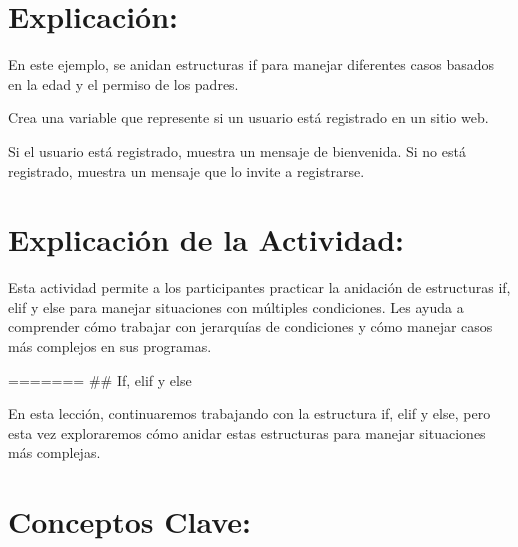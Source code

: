\documentclass[
  a4paper,
  onepage,
  openany]{scrreprt}
\begin{document}
\hypertarget{explicaciuxf3n-32}{%
\section{Explicación:}\label{explicaciuxf3n-32}}

En este ejemplo, se anidan estructuras if para manejar diferentes casos
basados en la edad y el permiso de los padres.

\begin{tcolorbox}[enhanced jigsaw, breakable, opacityback=0, toptitle=1mm, coltitle=black, toprule=.15mm, rightrule=.15mm, colframe=quarto-callout-important-color-frame, opacitybacktitle=0.6, arc=.35mm, title=\textcolor{quarto-callout-important-color}{\faExclamation}\hspace{0.5em}{Actividad Práctica:}, titlerule=0mm, colbacktitle=quarto-callout-important-color!10!white, bottomtitle=1mm, bottomrule=.15mm, colback=white, left=2mm, leftrule=.75mm]

Crea una variable que represente si un usuario está registrado en un
sitio web.

Si el usuario está registrado, muestra un mensaje de bienvenida. Si no
está registrado, muestra un mensaje que lo invite a registrarse.

\end{tcolorbox}

\hypertarget{explicaciuxf3n-de-la-actividad-30}{%
\section{Explicación de la
Actividad:}\label{explicaciuxf3n-de-la-actividad-30}}

Esta actividad permite a los participantes practicar la anidación de
estructuras if, elif y else para manejar situaciones con múltiples
condiciones. Les ayuda a comprender cómo trabajar con jerarquías de
condiciones y cómo manejar casos más complejos en sus programas.

======= \#\# If, elif y else

En esta lección, continuaremos trabajando con la estructura if, elif y
else, pero esta vez exploraremos cómo anidar estas estructuras para
manejar situaciones más complejas.

\hypertarget{conceptos-clave-33}{%
\section{Conceptos Clave:}\label{conceptos-clave-33}}
\end{document}
